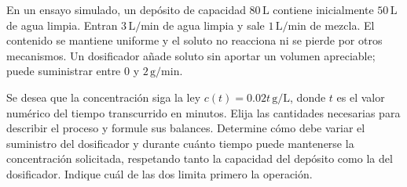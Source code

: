 En un ensayo simulado, un depósito de capacidad \(80\,\mathrm L\) contiene inicialmente \(50\,\mathrm L\) de agua limpia. Entran \(3\,\mathrm{L/min}\) de agua limpia y sale \(1\,\mathrm{L/min}\) de mezcla. El contenido se mantiene uniforme y el soluto no reacciona ni se pierde por otros mecanismos. Un dosificador añade soluto sin aportar un volumen apreciable; puede suministrar entre \(0\) y \(2\,\mathrm{g/min}\).

Se desea que la concentración siga la ley \(c(t)=0.02t\,\mathrm{g/L}\), donde \(t\) es el valor numérico del tiempo transcurrido en minutos. Elija las cantidades necesarias para describir el proceso y formule sus balances. Determine cómo debe variar el suministro del dosificador y durante cuánto tiempo puede mantenerse la concentración solicitada, respetando tanto la capacidad del depósito como la del dosificador. Indique cuál de las dos limita primero la operación.
